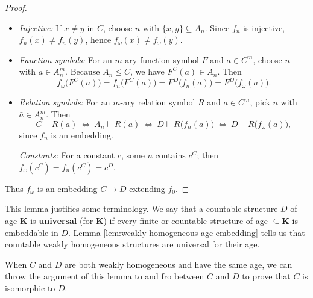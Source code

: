 \begin{proof}
    \begin{itemize}
        \item \emph{Injective:} If $x\neq y$ in $C$, choose $n$ with $\{x,y\}\subseteq A_n$. Since $f_n$ is injective, $f_n(x)\neq f_n(y)$, hence $f_\omega(x)\neq f_\omega(y)$.


        \item \emph{Function symbols:} For an $m$-ary function symbol $F$ and $\bar a\in C^m$, choose $n$ with $\bar a\in A_n^m$. Because $A_n\le C$, we have $F^C(\bar a)\in A_n$. Then
              \[
                  f_\omega\!\big(F^C(\bar a)\big)=f_n\!\big(F^C(\bar a)\big)
                  =F^D\!\big(f_n(\bar a)\big)=F^D\!\big(f_\omega(\bar a)\big).
              \]

        \item \emph{Relation symbols:} For an $m$-ary relation symbol $R$ and $\bar a\in C^m$, pick $n$ with $\bar a\in A_n^m$. Then
              \[
                  C\models R(\bar a)\ \Longleftrightarrow\ A_n\models R(\bar a)
                  \ \Longleftrightarrow\ D\models R\big(f_n(\bar a)\big)
                  \ \Longleftrightarrow\ D\models R\big(f_\omega(\bar a)\big),
              \]
              since $f_n$ is an embedding.

              \emph{Constants:} For a constant $c$, some $n$ contains $c^C$; then $f_\omega(c^C)=f_n(c^C)=c^D$.
    \end{itemize}






    Thus $f_\omega$ is an embedding $C\to D$ extending $f_0$.

\end{proof}




This lemma justifies some terminology. We say that a countable structure
\( D \) of age \( \mathbf{K} \) is \textbf{universal} (for \( \mathbf{K} \)) if every finite or countable
structure of age \( \subseteq \mathbf{K} \) is embeddable in \( D \). Lemma \ref{lem:weakly-homogeneous-age-embedding} tells us that countable
weakly homogeneous structures are universal for their age.

When \( C \) and \( D \) are both weakly homogeneous and have the same age, we
can throw the argument of this lemma to and fro between \( C \) and \( D \) to prove
that \( C \) is isomorphic to \( D \).

